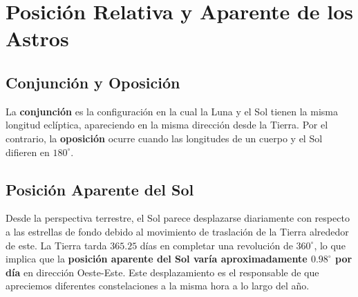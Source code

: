 \documentclass[a4paper]{article}
\begin{document}
\section{Posición Relativa y Aparente de los Astros}

\subsection{Conjunción y Oposición}

La \textbf{conjunción} es la configuración en la cual la Luna y el Sol tienen la misma longitud eclíptica, apareciendo en la misma dirección desde la Tierra. Por el contrario, la \textbf{oposición} ocurre cuando las longitudes de un cuerpo y el Sol difieren en $180^\circ$.

\subsection{Posición Aparente del Sol}

Desde la perspectiva terrestre, el Sol parece desplazarse diariamente con respecto a las estrellas de fondo debido al movimiento de traslación de la Tierra alrededor de este. La Tierra tarda $365.25$ días en completar una revolución de $360^\circ$, lo que implica que la \textbf{posición aparente del Sol varía aproximadamente $0.98^\circ$ por día} en dirección Oeste-Este. Este desplazamiento es el responsable de que apreciemos diferentes constelaciones a la misma hora a lo largo del año.




 
\end{document}
